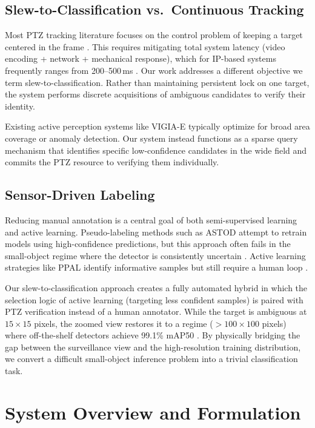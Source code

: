 \documentclass[conf]{new-aiaa}
\begin{document}
\subsection{Slew-to-Classification vs.\ Continuous Tracking}
Most PTZ tracking literature focuses on the control problem of keeping a target centered in the frame \cite{ptz_reproducible, ptz_eval}. This requires mitigating total system latency (video encoding + network + mechanical response), which for IP-based systems frequently ranges from 200--500\,ms \cite{ptz_latency_optics}. Our work addresses a different objective we term slew-to-classification. Rather than maintaining persistent lock on one target, the system performs discrete acquisitions of ambiguous candidates to verify their identity.

Existing active perception systems like VIGIA-E \cite{vigia_ptz} typically optimize for broad area coverage or anomaly detection. Our system instead functions as a sparse query mechanism that identifies specific low-confidence candidates in the wide field and commits the PTZ resource to verifying them individually.

\subsection{Sensor-Driven Labeling}
Reducing manual annotation is a central goal of both semi-supervised learning and active learning. Pseudo-labeling methods such as ASTOD \cite{self_training} attempt to retrain models using high-confidence predictions, but this approach often fails in the small-object regime where the detector is consistently uncertain \cite{self_training_enh}. Active learning strategies like PPAL \cite{active_learning_ppod} identify informative samples but still require a human loop \cite{active_learning_survey}.

Our slew-to-classification approach creates a fully automated hybrid in which the selection logic of active learning (targeting less confident samples) is paired with PTZ verification instead of a human annotator. While the target is ambiguous at $15 \times 15$ pixels, the zoomed view restores it to a regime ($>100 \times 100$ pixels) where off-the-shelf detectors achieve 99.1\% mAP50 \cite{yolo_flying}. By physically bridging the gap between the surveillance view and the high-resolution training distribution, we convert a difficult small-object inference problem into a trivial classification task.

\section{System Overview and Formulation}
\end{document}
